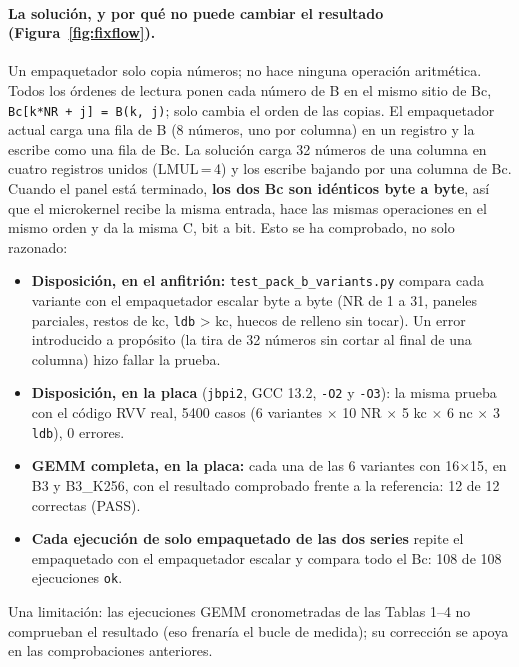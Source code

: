 \documentclass[10pt,a4paper]{article}
\newcommand{\key}[1]{\textbf{\textcolor{blue!55!black}{#1}}}  %
\begin{document}
\paragraph{La solución, y por qué no puede cambiar el resultado (Figura~\ref{fig:fixflow}).} Un empaquetador solo copia números; no
hace ninguna operación aritmética. Todos los órdenes de lectura ponen cada número de B en el mismo sitio de Bc,
\texttt{Bc[k*NR + j] = B(k, j)}; solo cambia el orden de las copias. El empaquetador actual carga una fila de B (8 números, uno por
columna) en un registro y la escribe como una fila de Bc. La solución carga 32 números de una columna en cuatro registros unidos
(LMUL\,=\,4) y los escribe bajando por una columna de Bc. Cuando el panel está terminado, \key{los dos Bc son idénticos byte a byte}, así
que el microkernel recibe la misma entrada, hace las mismas operaciones en el mismo orden y da la misma C, bit a bit. Esto se ha
comprobado, no solo razonado:
\begin{itemize}
  \item \textbf{Disposición, en el anfitrión:} \texttt{test\_pack\_b\_variants.py} compara cada variante con el empaquetador escalar
  byte a byte (NR de 1 a 31, paneles parciales, restos de kc, \texttt{ldb} > kc, huecos de relleno sin tocar). Un error introducido a
  propósito (la tira de 32 números sin cortar al final de una columna) hizo fallar la prueba.
  \item \textbf{Disposición, en la placa} (\texttt{jbpi2}, GCC 13.2, \texttt{-O2} y \texttt{-O3}): la misma prueba con el código RVV
  real, 5400 casos (6 variantes $\times$ 10 NR $\times$ 5 kc $\times$ 6 nc $\times$ 3 \texttt{ldb}), 0 errores.
  \item \textbf{GEMM completa, en la placa:} cada una de las 6 variantes con 16$\times$15, en B3 y B3\_K256, con el resultado
  comprobado frente a la referencia: 12 de 12 correctas (PASS).
  \item \textbf{Cada ejecución de solo empaquetado de las dos series} repite el empaquetado con el empaquetador escalar y compara todo
  el Bc: 108 de 108 ejecuciones \texttt{ok}.
\end{itemize}
Una limitación: las ejecuciones GEMM cronometradas de las Tablas 1--4 no comprueban el resultado (eso frenaría el bucle de
medida); su corrección se apoya en las comprobaciones anteriores.
\end{document}

